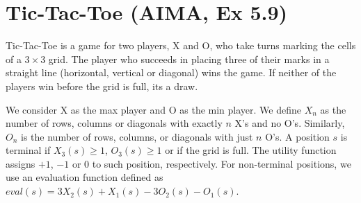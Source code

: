 \documentclass[11pt, a4paper]{article}
\begin{document}
\newpage

\section{Tic-Tac-Toe (AIMA, Ex 5.9)}

Tic-Tac-Toe is a game for two players, X and O, who take turns marking the cells of a $3 \times 3$ grid. The player who succeeds in placing three of their marks in a straight line (horizontal, vertical or diagonal) wins the game. If neither of the players win before the grid is full, its a draw.

We consider X as the max player and O as the min player. We define $X_n$ as the number of rows, columns or diagonals with exactly $n$ X's and no O's. Similarly, $O_n$ is the number of rows, columns, or diagonals with just $n$ O's. A position $s$ is terminal if $X_3(s) \geq 1$, $O_3(s) \geq 1$ or if the grid is full. The utility function assigns $+1$, $-1$ or $0$ to such position, respectively. For non-terminal positions, we use an evaluation function defined as $eval(s) = 3 X_2(s) + X_1(s) - 3 O_2(s) - O_1(s)$.
\end{document}
